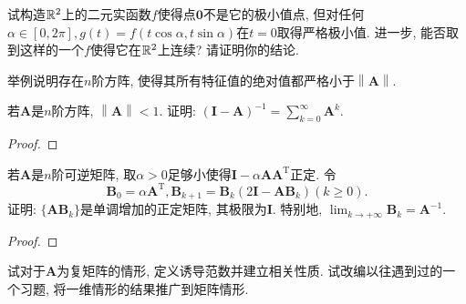 \begin{quizb}
\woe 试构造\(\mathbb{R}^2\)上的二元实函数\(f\)使得点\(\boldsymbol{0}\)不是它的极小值点, 但对任何\(\alpha\in[0,2\pi],g(t)=f(t\cos\alpha,t\sin\alpha)\)在\(t=0\)取得严格极小值. 进一步, 能否取到这样的一个\(f\)使得它在\(\mathbb{R}^2\)上连续? 请证明你的结论.
\begin{solution}

\end{solution}
\woe 举例说明存在\(n\)阶方阵, 使得其所有特征值的绝对值都严格小于\(\left\|\boldsymbol{A}\right\|\).
\begin{solution}

\end{solution}
\woe 若\(\boldsymbol{A}\)是\(n\)阶方阵, \(\left\|\boldsymbol{A}\right\|<1\). 证明: \(\left(\boldsymbol{I}-\boldsymbol{A}\right)^{-1}=\sum_{k=0}^{\infty}\boldsymbol{A}^k.\)
\begin{proof}

\end{proof}
\woe 若\(\boldsymbol{A}\)是\(n\)阶可逆矩阵, 取\(\alpha>0\)足够小使得\(\boldsymbol{I}-\alpha\boldsymbol{AA}^\mathrm{T}\)正定. 令\[\boldsymbol{B}_0=\alpha\boldsymbol{A}^\mathrm{T},\boldsymbol{B}_{k+1}=\boldsymbol{B}_k\left(2\boldsymbol{I}-\boldsymbol{AB}_k\right)(k\geqslant 0).\]证明: \(\{\boldsymbol{AB}_k\}\)是单调增加的正定矩阵, 其极限为\(\boldsymbol{I}\). 特别地, \(\lim_{k\rightarrow+\infty}\boldsymbol{B}_k=\boldsymbol{A}^{-1}\).
\begin{proof}

\end{proof}
\woe 试对于\(\boldsymbol{A}\)为复矩阵的情形, 定义诱导范数并建立相关性质.
\woe 试改编以往遇到过的一个习题, 将一维情形的结果推广到矩阵情形.
\end{quizb}
